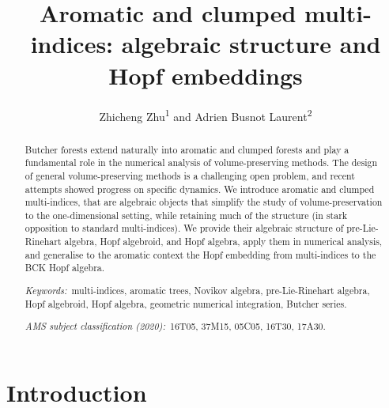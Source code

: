 \documentclass[a4paper,11pt]{article}
\title{
Aromatic and clumped multi-indices: algebraic structure and Hopf embeddings
}
\author{
Zhicheng Zhu\textsuperscript{1} and Adrien Busnot Laurent\textsuperscript{2}
}
\begin{document}


\maketitle

\begin{abstract}

Butcher forests extend naturally into aromatic and clumped forests and play a fundamental role in the numerical analysis of volume-preserving methods. The design of general volume-preserving methods is a challenging open problem, and recent attempts showed progress on specific dynamics.
We introduce aromatic and clumped multi-indices, that are algebraic objects that simplify the study of volume-preservation to the one-dimensional setting, while retaining much of the structure (in stark opposition to standard multi-indices). We provide their algebraic structure of pre-Lie-Rinehart algebra, Hopf algebroid, and Hopf algebra, apply them in numerical analysis, and generalise to the aromatic context the Hopf embedding from multi-indices to the BCK Hopf algebra.




\smallskip
%
\noindent
{\it Keywords:\,} multi-indices, aromatic trees, Novikov algebra, pre-Lie-Rinehart algebra, Hopf algebroid, Hopf algebra, geometric numerical integration, Butcher series.
\smallskip

\noindent
{\it AMS subject classification (2020):\,}  16T05, 37M15, 05C05, 16T30, 17A30.
 \end{abstract}












\section{Introduction}
\label{section:Introduction}
\end{document}
